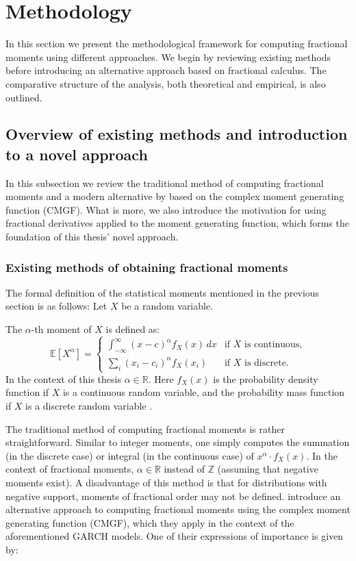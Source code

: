 \section{Methodology}\label{s:methodology}
In this section we present the methodological framework for computing fractional moments using different approaches. We begin by reviewing existing methods before introducing an alternative approach based on fractional calculus. The comparative structure of the analysis, both theoretical and empirical, is also outlined. 

\subsection{Overview of existing methods and introduction to a novel approach}\label{ss:methodology_overview}

In this subsection we review the traditional method of computing fractional moments and a modern alternative by \citet{hansen2024} based on the complex moment generating function (CMGF). What is more, we also introduce the motivation for using fractional derivatives applied to the moment generating function, which forms the foundation of this thesis’ novel approach.

\subsubsection{Existing methods of obtaining fractional moments}\label{ss:methodology_introduction}
The formal definition of the statistical moments mentioned in the previous section is as follows: Let \(X\) be a random variable.

The \(\alpha\)-th moment of  \(X\) is defined as:
\begin{equation}\label{eq:moments}
\mathbb{E}[X^\alpha] =
\begin{cases}
\int_{-\infty}^{\infty} (x - c)^\alpha f_X(x) \, dx & \text{if } X \text{ is continuous,} \\
\sum_{i} (x_i - c_i)^\alpha f_X(x_i) & \text{if } X \text{ is discrete.}
\end{cases}
\end{equation}
In the context of this thesis \(\alpha \in \mathbb{R}\). Here \(f_X(x)\) is the probability density function if \(X\) is a continuous random variable, and the probability mass function if \(X\) is a discrete random variable \citep{feller1957}. 

The traditional method of computing fractional moments is rather straightforward. Similar to integer moments, one simply computes the summation (in the discrete case) or integral (in the continuous case) of \(x^\alpha \cdot f_X(x)\). In the context of fractional moments, \(\alpha \in \mathbb{R}\) instead of \(\mathbb{Z}\) (assuming that negative moments exist). A disadvantage of this method is that for distributions with negative support, moments of fractional order may not be defined. \citet{hansen2024} introduce an alternative approach to computing fractional moments using the complex moment generating function (CMGF), which they apply in the context of the aforementioned GARCH models. One of their expressions of importance is given by:

